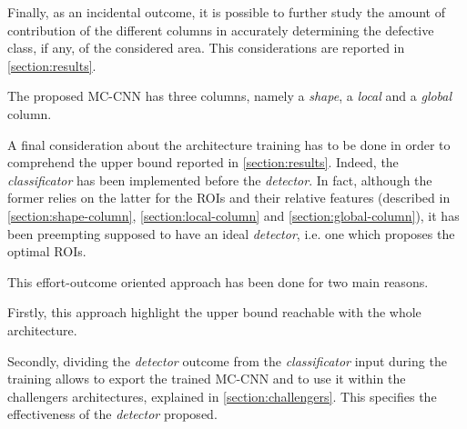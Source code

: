     \par{
        Finally, as an incidental outcome, it is possible to further study the amount of contribution of the different columns in accurately determining the defective class, if any, of the considered area. This considerations are reported in \ref{section:results}.
    }
    \par{
        The proposed MC-CNN has three columns, namely a \emph{shape}, a \emph{local} and a \emph{global} column.
    }
    \par{
        A final consideration about the architecture training has to be done in order to comprehend the upper bound reported in \ref{section:results}. Indeed, the \emph{classificator} has been implemented before the \emph{detector}. In fact, although the former relies on the latter for the ROIs and their relative features (described in \ref{section:shape-column}, \ref{section:local-column} and \ref{section:global-column}), it has been preempting supposed to have an ideal \emph{detector}, i.e. one which proposes the optimal ROIs.
    }
    \par{
        This effort-outcome oriented approach has been done for two main reasons.
    }
    \par{
        Firstly, this approach highlight the upper bound reachable with the whole architecture.
    }
    \par{
        Secondly, dividing the \emph{detector} outcome from the \emph{classificator} input during the training allows to export the trained MC-CNN and to use it within the challengers architectures, explained in \ref{section:challengers}. This specifies the effectiveness of the \emph{detector} proposed.
    }
